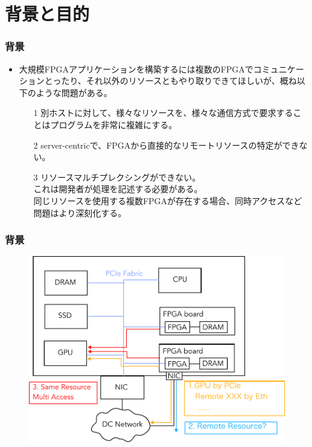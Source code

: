 \documentclass[dvipdfmx,9pt,notheorems]{beamer}
\theoremstyle{definition}
\begin{document}
\section{背景と目的}
\begin{frame}\frametitle{背景}
\begin{itemize}
	\item 大規模FPGAアプリケーションを構築するには複数のFPGAでコミュニケーションとったり、それ以外のリソースともやり取りできてほしいが、概ね以下のような問題がある。
	\begin{itemize}
		\item[1] 別ホストに対して、様々なリソースを、様々な通信方式で要求することはプログラムを非常に複雑にする。
		\item[2] server-centricで、FPGAから直接的なリモートリソースの特定ができない。
		\item[3] リソースマルチプレクシングができない。\\これは開発者が処理を記述する必要がある。\\同じリソースを使用する複数FPGAが存在する場合、同時アクセスなど問題はより深刻化する。
	\end{itemize}
\end{itemize}
\pnote{
}
\end{frame}


\begin{frame}\frametitle{背景}
  \begin{figure}[htb]
		\includegraphics[width=\linewidth]{fig/ez_FPGA_Base.pdf}
  \end{figure}
\pnote{
}
\end{frame}

\end{document}
